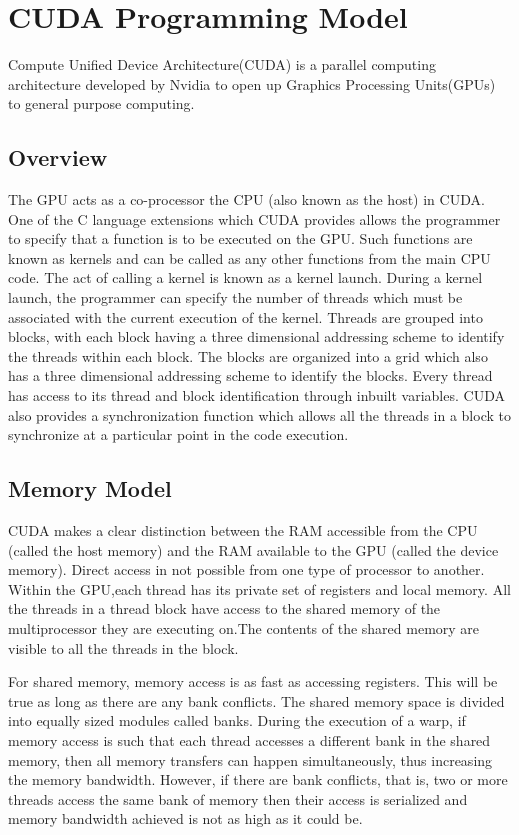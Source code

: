 \documentclass[a4paper,11pt]{report}
\begin{document}
\chapter{CUDA Programming Model}
Compute Unified Device Architecture(CUDA) is a parallel computing architecture developed by
Nvidia to open up Graphics Processing Units(GPUs) to general purpose computing.

\section{Overview}
The GPU acts as a co-processor the CPU (also known as the host) in CUDA. One of the C language
extensions which CUDA provides allows the programmer to specify that a function is to be executed
on the GPU. Such functions are known as kernels and can be called as any other functions from
the main CPU code. The act of calling a kernel is known as a kernel launch. During a kernel
launch, the programmer can specify the number of threads which must be associated with the
current execution of the kernel. Threads are grouped into blocks, with each block having a three
dimensional addressing scheme to identify the threads within each block. The blocks are organized
into a grid which also has a three dimensional addressing scheme to identify the blocks. Every
thread has access to its thread and block identification through inbuilt variables. CUDA also provides a synchronization function which allows all the threads in a block to synchronize at a particular point in the code execution.

\section{Memory Model}
CUDA makes a clear distinction between the RAM accessible from the CPU (called the host
memory) and the RAM available to the GPU (called the device memory). Direct access in not
possible from one type of processor to another.
Within the GPU,each thread has its private set of registers and local memory. All the threads in
a thread block have access to the shared memory of the multiprocessor they are executing on.The
contents of the shared memory are visible to all the threads in the block.

For shared memory, memory access is as fast as accessing registers. This will be true as long
as there are any bank conflicts. The shared memory space is divided into equally sized modules
called banks. During the execution of a warp, if memory access is such that each thread accesses
a different bank in the shared memory, then all memory transfers can happen simultaneously, thus
increasing the memory bandwidth. However, if there are bank conflicts, that is, two or more threads
access the same bank of memory then their access is serialized and memory bandwidth achieved is
not as high as it could be.
\end{document}

